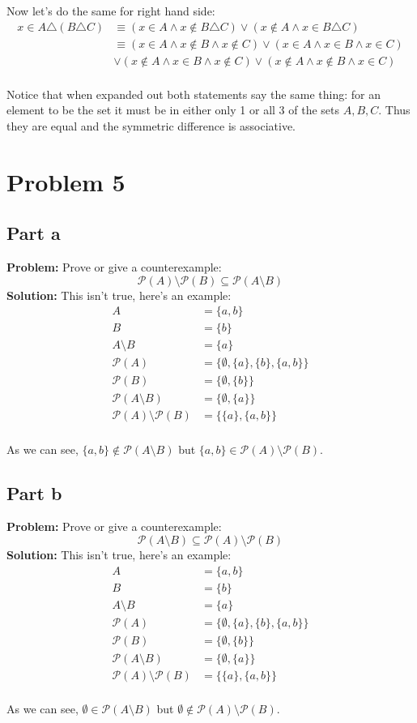 \documentclass{article}
\begin{document}
Now let's do the same for right hand side:
\begin{align*}
  x\in A\triangle (B\triangle C)&\equiv(x\in A\wedge x\not\in B\triangle C)\vee(x\not\in A\wedge x\in B\triangle C)\\
  &\equiv(x\in A\wedge x\not\in B\wedge x\not\in C)\vee(x\in A\wedge x\in B\wedge x\in C)\\
  &\vee(x\not\in A\wedge x\in B\wedge x\not\in C)\vee(x\not\in A\wedge x\not\in B\wedge x\in C)\\
\end{align*}

Notice that when expanded out both statements say the same thing: for an element to be the set it must be in either only 1 or all 3 of the sets $A,B,C$. Thus they are equal and the symmetric difference is associative.

\section*{Problem 5}
\subsection*{Part a}
\textbf{Problem:} Prove or give a counterexample:
$$\mathcal P(A)\setminus\mathcal P(B)\subseteq\mathcal P(A\setminus B)$$
\textbf{Solution:} This isn't true, here's an example:
\begin{align*}
  A&=\{a,b\}\\
  B&=\{b\}\\
  A\setminus B&=\{a\}\\
  \mathcal P(A)&=\{\emptyset,\{a\},\{b\},\{a,b\}\}\\
  \mathcal P(B)&=\{\emptyset,\{b\}\}\\
  \mathcal P(A\setminus B)&=\{\emptyset,\{a\}\}\\
  \mathcal P(A)\setminus\mathcal P(B)&=\{\{a\},\{a,b\}\}\\
\end{align*}

As we can see, $\{a,b\}\not\in\mathcal P(A\setminus B)$ but $\{a,b\}\in\mathcal P(A)\setminus\mathcal P(B)$.

\subsection*{Part b}
\textbf{Problem:} Prove or give a counterexample:
$$\mathcal P(A\setminus B)\subseteq\mathcal P(A)\setminus\mathcal P(B)$$
\textbf{Solution:} This isn't true, here's an example:
\begin{align*}
  A&=\{a,b\}\\
  B&=\{b\}\\
  A\setminus B&=\{a\}\\
  \mathcal P(A)&=\{\emptyset,\{a\},\{b\},\{a,b\}\}\\
  \mathcal P(B)&=\{\emptyset,\{b\}\}\\
  \mathcal P(A\setminus B)&=\{\emptyset,\{a\}\}\\
  \mathcal P(A)\setminus\mathcal P(B)&=\{\{a\},\{a,b\}\}\\
\end{align*}

As we can see, $\emptyset\in\mathcal P(A\setminus B)$ but $\emptyset\not\in\mathcal P(A)\setminus\mathcal P(B)$.
\end{document}
